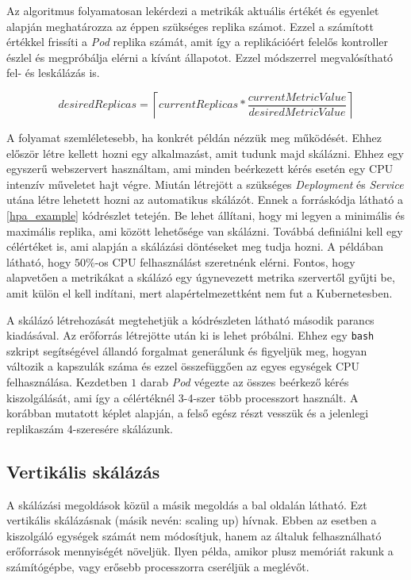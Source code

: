 Az algoritmus folyamatosan lekérdezi a metrikák aktuális értékét és  egyenlet alapján meghatározza az éppen szükséges replika számot. Ezzel a számított értékkel frissíti a \textit{Pod} replika számát, amit így a replikációért felelős kontroller észlel és megpróbálja elérni a kívánt állapotot. Ezzel módszerrel megvalósítható fel- és leskálázás is.

\begin{equation}
\label{hpa_algo}
desiredReplicas = \left\lceil currentReplicas * \frac{currentMetricValue}{desiredMetricValue} \right\rceil
\end{equation}

A folyamat szemléletesebb, ha konkrét példán nézzük meg működését.
Ehhez először létre kellett hozni egy alkalmazást, amit tudunk majd skálázni.
Ehhez egy egyszerű webszervert használtam, ami minden beérkezett kérés esetén egy CPU intenzív műveletet hajt végre. 
Miután létrejött a szükséges \textit{Deployment} és \textit{Service} utána létre lehetett hozni az automatikus skálázót.
Ennek a forráskódja látható a \ref{hpa_example} kódrészlet tetején.
Be lehet állítani, hogy mi legyen a minimális és maximális replika, ami között lehetősége van skálázni. 
Továbbá definiálni kell egy célértéket is, ami alapján a skálázási döntéseket meg tudja hozni.
A példában látható, hogy $50\%$-os CPU felhasználást szeretnénk elérni.
Fontos, hogy alapvetően a metrikákat a skálázó egy úgynevezett metrika szervertől gyűjti be, amit külön el kell indítani, mert alapértelmezettként nem fut a Kubernetesben.

A skálázó létrehozását megtehetjük a kódrészleten látható második parancs kiadásával.
Az erőforrás létrejötte után ki is lehet próbálni.
Ehhez egy \verb+bash+ szkript segítségével állandó forgalmat generálunk és figyeljük meg, hogyan változik a kapszulák száma és ezzel összefüggően az egyes egységek CPU felhasználása.
Kezdetben $1$ darab \textit{Pod} végezte az összes beérkező kérés kiszolgálását, ami így a célértéknél 3-4-szer több processzort használt.
A korábban mutatott képlet alapján, a felső egész részt vesszük és a jelenlegi replikaszám 4-szeresére skálázunk. \\
 
\lstset{caption=Automatikus horizontális skálázás folyamata, label=hpa_example}



\subsection{Vertikális skálázás}
A skálázási megoldások közül a másik megoldás a  bal oldalán látható. 
Ezt vertikális skálázásnak (másik nevén: scaling up) hívnak. 
Ebben az esetben a kiszolgáló egységek számát nem módosítjuk, hanem az általuk felhasználható erőforrások mennyiségét növeljük.
Ilyen példa, amikor plusz memóriát rakunk a számítógépbe, vagy erősebb processzorra cseréljük a meglévőt. 

